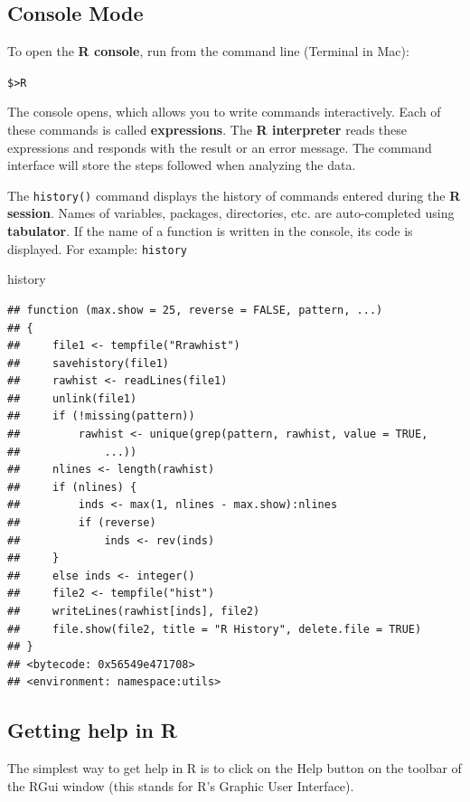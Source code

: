 \documentclass[
]{book}
\newenvironment{Shaded}{\begin{snugshade}}{\end{snugshade}}
\newcommand{\NormalTok}[1]{#1}
\theoremstyle{definition}
\theoremstyle{definition}
\theoremstyle{definition}
\theoremstyle{definition}
\theoremstyle{remark}
\begin{document}
\hypertarget{console-mode}{%
\subsection{Console Mode}\label{console-mode}}

To open the \textbf{R console}, run from the command line (Terminal in Mac):

\texttt{\$\textgreater{}R}

The console opens, which allows you to write commands interactively. Each of these commands is called \textbf{expressions}. The \textbf{R interpreter} reads these expressions and responds with the result or an error message. The command interface will store the steps followed when analyzing the data.

The \texttt{history()} command displays the history of commands entered during the \textbf{R session}. Names of variables, packages, directories, etc. are auto-completed using \textbf{tabulator}. If the name of a function is written in the console, its code is displayed. For example: \texttt{history}

\begin{Shaded}
\begin{Highlighting}[]
\NormalTok{history}
\end{Highlighting}
\end{Shaded}

\begin{verbatim}
## function (max.show = 25, reverse = FALSE, pattern, ...) 
## {
##     file1 <- tempfile("Rrawhist")
##     savehistory(file1)
##     rawhist <- readLines(file1)
##     unlink(file1)
##     if (!missing(pattern)) 
##         rawhist <- unique(grep(pattern, rawhist, value = TRUE, 
##             ...))
##     nlines <- length(rawhist)
##     if (nlines) {
##         inds <- max(1, nlines - max.show):nlines
##         if (reverse) 
##             inds <- rev(inds)
##     }
##     else inds <- integer()
##     file2 <- tempfile("hist")
##     writeLines(rawhist[inds], file2)
##     file.show(file2, title = "R History", delete.file = TRUE)
## }
## <bytecode: 0x56549e471708>
## <environment: namespace:utils>
\end{verbatim}

\hypertarget{getting-help-in-r}{%
\subsection{Getting help in R}\label{getting-help-in-r}}

The simplest way to get help in R is to click on the Help button on the toolbar of the RGui window (this stands for R's Graphic User Interface).
\end{document}
